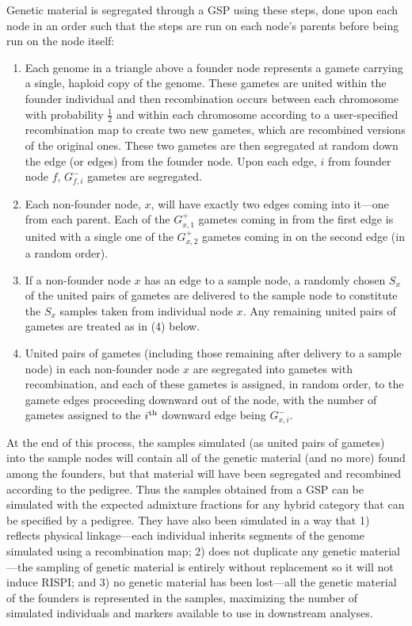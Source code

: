 Genetic material is segregated through
a GSP using these steps, done upon each node in an order such that the steps
are run on each node's parents before being run on the node itself:
\begin{enumerate}
\item Each genome in a triangle above a founder node represents a gamete
carrying a single, haploid copy of the genome.
These gametes are united within the founder individual and then
recombination occurs between each chromosome
with probability $\frac{1}{2}$ and within each chromosome according to
a user-specified recombination map to create two new gametes, which are
recombined versions of the original ones.  These two gametes are then segregated at random down the edge (or edges) from the founder node. Upon each edge, $i$ from founder node $f$, $G^-_{f,i}$ gametes are segregated. 
\item Each non-founder node, $x$, will have exactly two edges coming
into it---one from each parent.  Each of the $G^+_{x,1}$ gametes coming in from the
first edge is united with a single one of the $G^+_{x,2}$ gametes coming
in on the second edge (in a random order).
\item If a non-founder node $x$ has an edge to a sample node,
a randomly chosen $S_x$ of the united pairs of gametes are delivered
to the sample node to constitute the $S_x$ samples taken from individual
node $x$. Any remaining united pairs of gametes are treated as in (4) below.
\item United pairs of gametes (including those remaining after delivery
to a sample node) in each non-founder node $x$ are segregated into
gametes with recombination, and each of these gametes is assigned, in
random order, to the gamete edges proceeding downward out of the node,
with the number of gametes assigned to the $i^\mathrm{th}$ downward edge being
$G^-_{x,i}$.
\end{enumerate}
At the end of this process, the samples simulated (as united pairs of gametes)
into the sample nodes will contain all of the genetic material (and no more) found among the founders, but that
material will have been segregated and recombined according to the pedigree.  Thus the
samples obtained from a GSP can be simulated with the expected admixture fractions
for any hybrid category that can be specified by a pedigree.  They have also been simulated
in a way that 1) reflects physical linkage---each individual inherits segments of the genome
simulated using a recombination map; 2) does not duplicate any genetic material---the sampling of
genetic material is entirely without replacement so it will not induce RISPI; and 3) no genetic material has been lost---all the genetic material of the founders
is represented in the samples, maximizing the number of simulated individuals and markers available to
use in downstream analyses.

